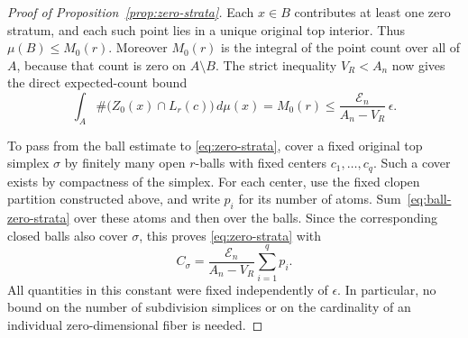 \begin{proof}[Proof of Proposition~\ref{prop:zero-strata}]
Each $x\in B$ contributes at least one zero stratum, and each such point
lies in a unique original top interior.  Thus $\mu(B)\le M_0(r)$.
Moreover $M_0(r)$ is the integral of the point count over all of $A$,
because that count is zero on $A\setminus B$.  The strict inequality
$V_R<A_n$ now gives the direct expected-count bound
\begin{equation}\label{eq:ball-zero-strata}
 \int_A\#\bigl(Z_0(x)\cap L_r(c)\bigr)\,d\mu(x)
 =M_0(r)\le\frac{\mathcal E_n}{A_n-V_R}\,\epsilon.
\end{equation}

To pass from the ball estimate to \eqref{eq:zero-strata}, cover a fixed
original top simplex $\sigma$ by finitely many open
$r$-balls with fixed centers $c_1,\ldots,c_q$.  Such a cover exists by
compactness of the simplex.  For each center, use the fixed clopen
partition constructed above, and write $p_i$ for its number of atoms.
Sum~\eqref{eq:ball-zero-strata} over these atoms and then over the balls.
Since the corresponding closed balls also cover $\sigma$, this proves
\eqref{eq:zero-strata} with
\[
 C_\sigma=\frac{\mathcal E_n}{A_n-V_R}\sum_{i=1}^q p_i.
\]
All quantities in this constant were fixed independently of $\epsilon$.
In particular, no bound on the number of subdivision simplices or on
the cardinality of an individual zero-dimensional fiber is needed.
\end{proof}
